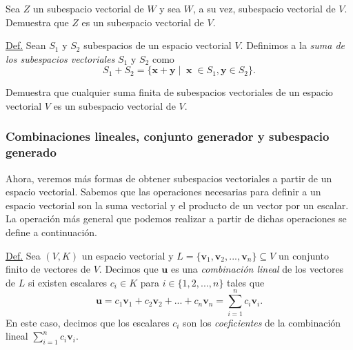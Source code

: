 \documentclass[apuntes]{subfiles}
\begin{document}
\begin{ejer}\label{ejer: La relación de ser subespacio vectorial es transitiva}
    Sea $Z$ un subespacio vectorial de $W$ y sea $W$, a su vez, subespacio vectorial de $V$. Demuestra que $Z$ es un subespacio vectorial de $V$.
\end{ejer}

\begin{tcolorbox}
    \underline{Def.} Sean $S_1$ y $S_2$ subespacios de un espacio vectorial $V$. Definimos a la \emph{suma de los subespacios vectoriales} $S_1$ y $S_2$ como
    \[
    S_1+S_2=\{\mathbf{x}+\mathbf{y}\mathop|\mathop \mathbf{x}\in S_1, \mathbf{y}\in S_2\}.
    \] 
\end{tcolorbox}

\begin{ejer}\label{ejer: La suma de subespacios vectoriales es un subespacio vectorial}
    Demuestra que cualquier suma finita de subespacios vectoriales de un espacio vectorial $V$ es un subespacio vectorial de $V$.
\end{ejer}

\subsubsection*{Combinaciones lineales, conjunto generador y subespacio generado} \label{Sssec: Combinaciones lineales, conjunto generador y subespacio generado}

Ahora, veremos más formas de obtener subespacios vectoriales a partir de un espacio vectorial. Sabemos que las operaciones necesarias para definir a un espacio vectorial son la suma vectorial y el producto de un vector por un escalar. La operación más general que podemos realizar a partir de dichas operaciones se define a continuación.

\begin{tcolorbox}
    \underline{Def.} Sea $(V,K)$ un espacio vectorial y $L=\{\mathbf{v}_1, \mathbf{v}_2, ..., \mathbf{v}_n\}\subseteq V$ un conjunto finito de vectores de $V$. Decimos que $\mathbf{u}$ es una \emph{combinación lineal} de los vectores de $L$ si existen escalares $c_i\in K$ para $i\in\{1,2,...,n\}$ tales que
    \[
    \mathbf{u} =c_1\mathbf{v}_1+c_2\mathbf{v}_2+...+c_n\mathbf{v}_n=\sum_{i=1}^n c_i\mathbf{v}_i.
    \] 
    En este caso, decimos que los escalares $c_i$ son los \emph{coeficientes} de la combinación lineal $\sum_{i=1}^n c_i\mathbf{v}_i$.
\end{tcolorbox}
\end{document}

